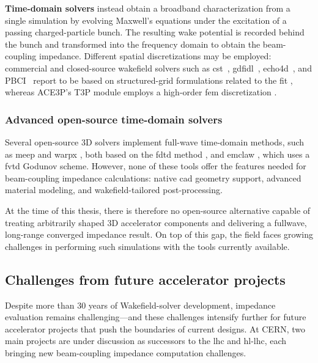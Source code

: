 \textbf{Time-domain solvers} instead obtain a broadband characterization from a single simulation by evolving Maxwell's equations under the excitation of a passing charged-particle bunch. The resulting wake potential is recorded behind the bunch and transformed into the frequency domain to obtain the beam-coupling impedance. Different spatial discretizations may be employed: commercial and closed-source wakefield solvers such as
\gls{cst}~\cite{cst_studio_suite}, \gls{gdfidl}~\cite{bruns_gdfidl_1997},
\gls{echo4d}~\cite{zagorodnov_echo4d}, and PBCI~\cite{Lau:1182975} report to be based on structured-grid
formulations related to the \gls{fit} \cite{weiland_finite_2003}, whereas ACE3P's T3P module employs a high-order \gls{fem} discretization \cite{candel_ace3p_2010}.

\subsubsection{Advanced open-source time-domain solvers}

Several open-source 3D solvers implement full-wave time-domain methods, such as \gls{meep} \cite{oskooi_meep_2010} and \gls{warpx}
\cite{fedeli_pushing_2022}, both based on the \gls{fdtd} method \cite{yee_numerical_1966}, and \gls{emclaw} \cite{moreno_emclaw_2021}, which
uses a \gls{fvtd} Godunov scheme. However, none of these tools offer the features needed for beam-coupling impedance calculations: native
\gls{cad} geometry support, advanced material modeling, and wakefield-tailored post-processing.

At the time of this thesis, there is therefore no open-source alternative capable of treating arbitrarily shaped 3D accelerator components and delivering a fullwave, long-range converged impedance result. On top of this gap, the field faces growing challenges in performing such simulations with the tools currently available.

\subsection{Challenges from future accelerator projects}

Despite more than 30 years of Wakefield-solver development, impedance evaluation remains challenging---and these challenges intensify further for future accelerator projects that push the boundaries of current designs. At CERN, two main projects are under discussion as successors to the \gls{lhc} and \gls{hl-lhc}, each bringing new beam-coupling impedance computation challenges.


